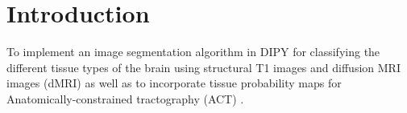 \documentclass[twocolumn]{bmcart}%
\begin{document}
\begin{frontmatter}
\begin{fmbox}


	








%
\end{fmbox}%

\end{frontmatter}


\section{Introduction}\label{introduction}

To implement an image segmentation algorithm in DIPY
\cite{Garyfallidis2014} for classifying the different tissue types of
the brain using structural T1 images and diffusion MRI images (dMRI) as
well as to incorporate tissue probability maps for
Anatomically-constrained tractography (ACT) \cite{Smith20121924}.
\end{document}
